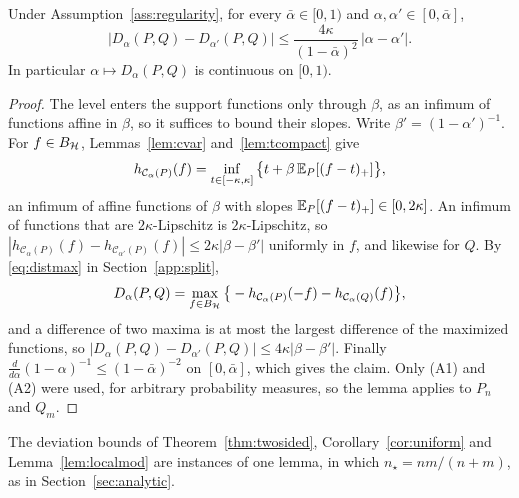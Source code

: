 \begin{lemma}
\label{lem:continuity}
Under Assumption~\ref{ass:regularity}, for every $\bar\alpha\in[0,1)$ and $\alpha,\alpha'\in[0,\bar\alpha]$,
\[
\left|D_\alpha(P,Q)-D_{\alpha'}(P,Q)\right|\le\frac{4\kappa}{(1-\bar\alpha)^2}\,|\alpha-\alpha'| .
\]
In particular $\alpha\mapsto D_\alpha(P,Q)$ is continuous on $[0,1)$.
\end{lemma}

\begin{proof}
The level enters the support functions only through $\beta$, as an infimum of functions affine in $\beta$, so it
suffices to bound their slopes. Write $\beta'=(1-\alpha')^{-1}$. For $f\in B_{\mathcal{H}}$, Lemmas~\ref{lem:cvar} and~\ref{lem:tcompact} give
\[
h_{\mathcal C_\alpha(P)}(f)=\inf_{t\in[-\kappa,\kappa]}\big\{t+\beta\,\mathbb{E}_P[(f-t)_+]\big\},
\]
an infimum of affine functions of $\beta$ with slopes $\mathbb{E}_P[(f-t)_+]\in[0,2\kappa]$. An infimum of functions that are
$2\kappa$-Lipschitz is $2\kappa$-Lipschitz, so $|h_{\mathcal C_\alpha(P)}(f)-h_{\mathcal C_{\alpha'}(P)}(f)|\le
2\kappa|\beta-\beta'|$ uniformly in $f$, and likewise for $Q$. By \eqref{eq:distmax} in Section~\ref{app:split},
\[
D_\alpha(P,Q)=\max_{f\in B_{\mathcal{H}}}\big\{-h_{\mathcal C_\alpha(P)}(-f)-h_{\mathcal C_\alpha(Q)}(f)\big\},
\]
and a difference of two maxima is at most the largest difference of the maximized functions, so
$|D_\alpha(P,Q)-D_{\alpha'}(P,Q)|\le4\kappa|\beta-\beta'|$. Finally
$\tfrac{d}{d\alpha}(1-\alpha)^{-1}\le(1-\bar\alpha)^{-2}$ on $[0,\bar\alpha]$, which gives the claim. Only (A1) and (A2)
were used, for arbitrary probability measures, so the lemma applies to $P_n$ and $Q_m$.
\end{proof}

The deviation bounds of Theorem~\ref{thm:twosided}, Corollary~\ref{cor:uniform} and Lemma~\ref{lem:localmod} are
instances of one lemma, in which $n_\star=nm/(n+m)$, as in Section~\ref{sec:analytic}.

